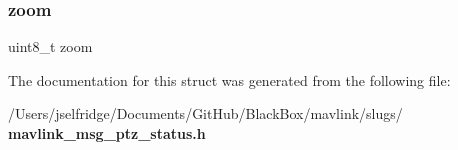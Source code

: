 \subsubsection{zoom}
{\footnotesize\ttfamily uint8\+\_\+t zoom}



The documentation for this struct was generated from the following file\+:\begin{DoxyCompactItemize}
\item 
/\+Users/jselfridge/\+Documents/\+Git\+Hub/\+Black\+Box/mavlink/slugs/\textbf{ mavlink\+\_\+msg\+\_\+ptz\+\_\+status.\+h}\end{DoxyCompactItemize}
